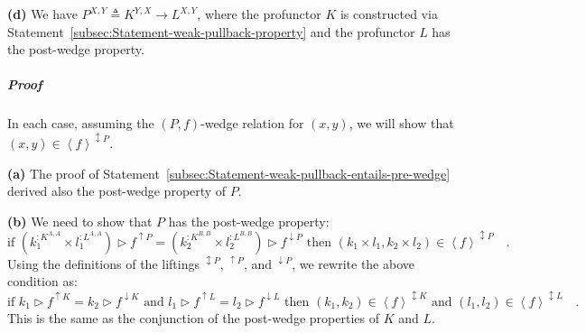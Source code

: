 \textbf{(d)} We have $P^{X,Y}\triangleq K^{Y,X}\rightarrow L^{X,Y}$,
where the profunctor $K$ is constructed via Statement~\ref{subsec:Statement-weak-pullback-property}
and the profunctor $L$ has the post-wedge property.%
\begin{comment}
\textbf{(e)} We have a recursive type $P^{X,Y}\triangleq S^{X,Y,P^{X,Y}}$,
where $S^{X,Y,R}$ is contravariant in $X$ and covariant in $Y$
and $R$, and has the post-wedge property when viewed as a profunctor
with respect to $X$ and $Y$.
\end{comment}


\subparagraph{Proof}

In each case, assuming the $\left(P,f\right)$-wedge relation for
$(x,y)$, we will show that $(x,y)\in\left<f\right>^{\updownarrow P}$. 

\textbf{(a)} The proof of Statement~\ref{subsec:Statement-weak-pullback-entails-pre-wedge}
derived also the post-wedge property of $P$.

\textbf{(b)} We need to show that $P$ has the post-wedge property:
\[
\text{if }(k_{1}^{:K^{A,A}}\times l_{1}^{:L^{A,A}})\triangleright f^{\uparrow P}=(k_{2}^{:K^{B,B}}\times l_{2}^{:L^{B,B}})\triangleright f^{\downarrow P}\text{ then }(k_{1}\times l_{1},k_{2}\times l_{2})\in\left<f\right>^{\updownarrow P}\quad.
\]
Using the definitions of the liftings $^{\updownarrow P}$, $^{\uparrow P}$,
and $^{\downarrow P}$, we rewrite the above condition as:
\[
\text{if }k_{1}\triangleright f^{\uparrow K}=k_{2}\triangleright f^{\downarrow K}\text{ and }l_{1}\triangleright f^{\uparrow L}=l_{2}\triangleright f^{\downarrow L}\text{ then }(k_{1},k_{2})\in\left<f\right>^{\updownarrow K}\text{ and }(l_{1},l_{2})\in\left<f\right>^{\updownarrow L}\quad.
\]
This is the same as the conjunction of the post-wedge properties of
$K$ and $L$. 

